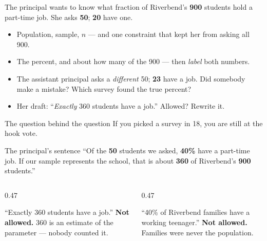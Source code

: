 \documentclass[aspectratio=169, 11pt]{beamer}
\newcommand{\redink}[1]{{\color{redacc}\bfseries #1}}
\begin{document}
\begin{frame}[t, plain]
  The principal wants to know what fraction of Riverbend's \textbf{900} students hold a
  part-time job. She asks \textbf{50}; \textbf{20} have one.
  \begin{itemize}\setlength{\itemsep}{5pt}
    \item[16.] Population, sample, $n$ --- and one constraint that kept her from asking all 900.
    \item[17.] The percent, and about how many of the 900 --- then \emph{label} both numbers.
    \item[18.] The assistant principal asks a \emph{different} 50; \textbf{23} have a job.
          Did somebody make a mistake? Which survey found the true percent?
    \item[19.] Her draft: ``\emph{Exactly} 360 students have a job.'' Allowed? Rewrite it.
  \end{itemize}
  \begin{block}{The question behind the question}
    If you picked a survey in 18, you are still at the hook vote.
  \end{block}
\end{frame}

\begin{frame}[t, plain]
  \vspace{4pt}
  \begin{block}{The principal's sentence}
    ``Of the \textbf{50} students we asked, \textbf{40\%} have a part-time job. If our sample
    represents the school, that is about \textbf{360} of Riverbend's \textbf{900} students.''
  \end{block}
  \vspace{8pt}
  \begin{columns}[t]
    \begin{column}{0.47\textwidth}
      \begin{block}{``Exactly 360 students have a job.''}
        \redink{Not allowed.} 360 is an estimate of the parameter --- nobody counted it.
      \end{block}
    \end{column}
    \begin{column}{0.47\textwidth}
      \begin{block}{``40\% of Riverbend families have a working teenager.''}
        \redink{Not allowed.} Families were never the population.
      \end{block}
    \end{column}
  \end{columns}
\end{frame}
\end{document}
